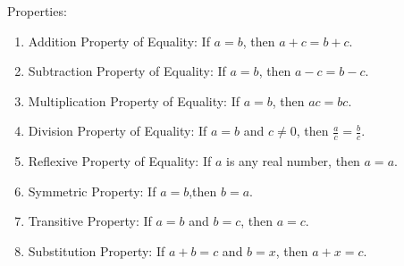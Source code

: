 \vspce 

Properties: 
\begin{enumerate}[label = \arabic*. ]
\item Addition Property of Equality: If $a = b$, then $a + c = b + c$.
\item Subtraction Property of Equality: If $a = b$, then $a - c = b - c$.
\item Multiplication Property of Equality: If $a = b$, then $ac = bc$.
\item Division Property of Equality: If $a = b$ and $c\neq 0$, then $\displaystyle \frac{a}{c} = \displaystyle \frac{b}{c}$.
\item Reflexive Property of Equality: If $a$ is any real number, then $a = a$.
\item Symmetric Property:  If $a=b$,then $b = a$.
\item Transitive Property: If $a=b$ and $b=c$, then $a=c$.
\item Substitution Property: If $a + b = c$ and $b = x$, then $a + x = c$.
\end{enumerate} 








